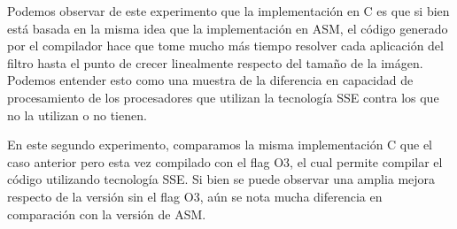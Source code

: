 \documentclass[a4paper]{article}
\begin{document}
Podemos observar de este experimento que la implementación en C es que si bien está basada en la misma idea que la implementación en ASM,
el código generado por el compilador hace que tome mucho más tiempo resolver cada aplicación del filtro hasta el punto de crecer linealmente
respecto del tamaño de la imágen. Podemos entender esto como una muestra de la diferencia en capacidad de procesamiento de los procesadores que utilizan
la tecnología SSE contra los que no la utilizan o no tienen.

\begin{figure}[!ht]
    \centering
    \begin{floatrow}
    \end{floatrow}
\end{figure}

En este segundo experimento, comparamos la misma implementación C que el caso anterior pero esta vez compilado con el flag O3, 
el cual permite compilar el código utilizando tecnología SSE. Si bien se puede observar una amplia mejora respecto de la versión
sin el flag O3, aún se nota mucha diferencia en comparación con la versión de ASM.
\newline
\end{document}
